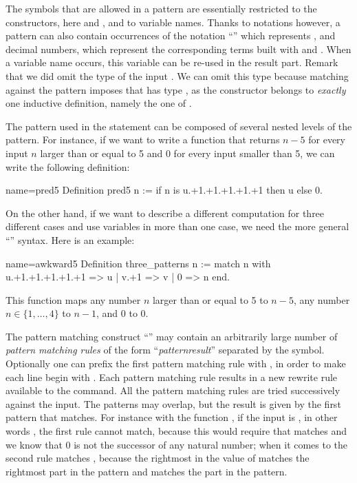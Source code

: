 The symbols that are allowed in a pattern are essentially restricted
to the constructors, here  and , and to variable names.
Thanks to notations however, a pattern can also contain
occurrences of the notation ``'' which represents , and
decimal numbers, which represent the corresponding terms built with
 and .  When a variable name occurs, this variable can be
re-used in the result part.
Remark that we did omit the type of the input . We can omit this
type because matching
 against  the  pattern imposes that  has type
, as the  constructor belongs to \emph{exactly}
one inductive definition, namely the one of .

The pattern used in the  statement can be composed of
several nested levels of the  pattern.  For instance,
if we want to write a function
that returns \(n-5\) for every input \(n\) larger than or equal to 5 and 0
for every input smaller than 5, we can write the following definition:

\begin{coq}{name=pred5}{}
Definition pred5 n :=
  if n is u.+1.+1.+1.+1.+1 then u else 0.
\end{coq}

On the other hand, if we want to describe a different computation for
three different cases and use variables in more than one case, we need
the more general ``'' syntax.  Here is an
example:

\begin{coq}{name=awkward5}{}
Definition three_patterns n :=
  match n with
    u.+1.+1.+1.+1.+1 => u
  | v.+1 => v
  | 0 => n
  end.
\end{coq}

This function maps any number \(n\) larger than or equal to 5 to \(n-5\),
any number \(n \in \{1, \ldots, 4\}\) to \(n-1\), and \(0\) to \(0\).

The pattern matching construct ``'' may contain an
arbitrarily large number of {\em pattern matching rules} of the form
``\emph{pattern}\C{ =>$~$}\emph{result}''
separated by the \C{|} symbol.  Optionally one can
prefix the first pattern matching rule with \C{|}, in order to make each line
begin with \C{|}. Each pattern matching rule results in a new rewrite
rule available to the  command.
All
the pattern matching rules are tried successively against the input.  The
patterns may overlap, but the result is given by the first pattern that
matches.
For instance with the function , if the input is
, in other words , the first
rule cannot match, because this would require that  matches
 and we know that \(0\) is not the successor of any
natural number; when it comes to the second rule  matches
, because the rightmost  in the value of  matches
the rightmost  part in the pattern and  matches the  part
in the pattern.

